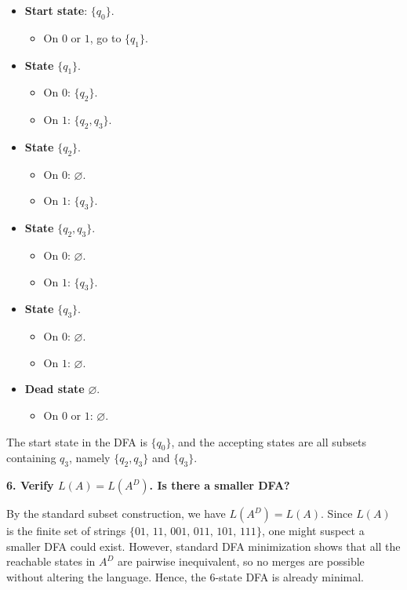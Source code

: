 \documentclass{article}
\theoremstyle{theorem}
\theoremstyle{definition}
\theoremstyle{remark}
\begin{document}
\begin{itemize}
\item \textbf{Start state}: $\{q_0\}$. 
  \begin{itemize}
  \item On $0$ or $1$, go to $\{q_1\}$.
  \end{itemize}
\item \textbf{State} $\{q_1\}$.
  \begin{itemize}
  \item On $0$: $\{q_2\}$.
  \item On $1$: $\{q_2,q_3\}$.
  \end{itemize}
\item \textbf{State} $\{q_2\}$.
  \begin{itemize}
  \item On $0$: $\varnothing$.
  \item On $1$: $\{q_3\}$.
  \end{itemize}
\item \textbf{State} $\{q_2,q_3\}$.
  \begin{itemize}
  \item On $0$: $\varnothing$.
  \item On $1$: $\{q_3\}$.
  \end{itemize}
\item \textbf{State} $\{q_3\}$.
  \begin{itemize}
  \item On $0$: $\varnothing$.
  \item On $1$: $\varnothing$.
  \end{itemize}
\item \textbf{Dead state} $\varnothing$.
  \begin{itemize}
  \item On $0$ or $1$: $\varnothing$.
  \end{itemize}
\end{itemize}

The start state in the DFA is $\{q_0\}$, and the accepting states are 
all subsets containing $q_3$, namely $\{q_2,q_3\}$ and $\{q_3\}$.

\textbf{6. Verify $L(A) = L(A^D)$. Is there a smaller DFA?}

By the standard subset construction, we have $L(A^D) = L(A)$. 
Since $L(A)$ is the finite set of strings $\{01,\,11,\,001,\,011,\,101,\,111\}$, 
one might suspect a smaller DFA could exist. However, standard DFA 
minimization shows that all the reachable states in $A^D$ are pairwise 
inequivalent, so no merges are possible without altering the language. 
Hence, the $6$-state DFA is already minimal.
\end{document}
